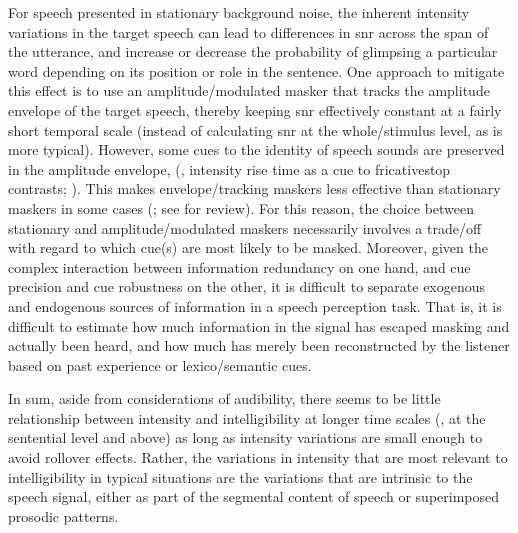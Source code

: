 For speech presented in stationary background noise, the inherent intensity variations in the target speech can lead to differences in \ac{snr} across the span of the utterance, and increase or decrease the probability of glimpsing a particular word depending on its position or role in the sentence.  One approach to mitigate this effect is to use an amplitude\-/modulated masker that tracks the amplitude envelope of the target speech, thereby keeping \ac{snr} effectively constant at a fairly short temporal scale (instead of calculating \ac{snr} at the whole\-/stimulus level, as is more typical).  However, some cues to the identity of speech sounds are preserved in the amplitude envelope, (\eg, intensity rise time as a cue to fricative\slsh stop contrasts; \citealt{ShinnBlumstein1984}).  This makes envelope\-/tracking maskers less effective than stationary maskers in some cases (\citealt{HoriiEtAl1971, VanTasellEtAl1987, BashfordEtAl1996}; see \citealt{Wright2004b} for review).  For this reason, the choice between stationary and amplitude\-/modulated maskers necessarily involves a trade\-/off with regard to which cue(s) are most likely to be masked.  Moreover, given the complex interaction between information redundancy on one hand, and cue precision and cue robustness on the other, it is difficult to separate exogenous and endogenous sources of information in a speech perception task.  That is, it is difficult to estimate how much information in the signal has escaped masking and actually been heard, and how much has merely been reconstructed by the listener based on past experience or lexico\-/semantic cues.

In sum, aside from considerations of audibility, there seems to be little relationship between intensity and intelligibility at longer time scales (\ie, at the sentential level and above) as long as intensity variations are small enough to avoid rollover effects.  Rather, the variations in intensity that are most relevant to intelligibility in typical situations are the variations that are intrinsic to the speech signal, either as part of the segmental content of speech or superimposed prosodic patterns.

